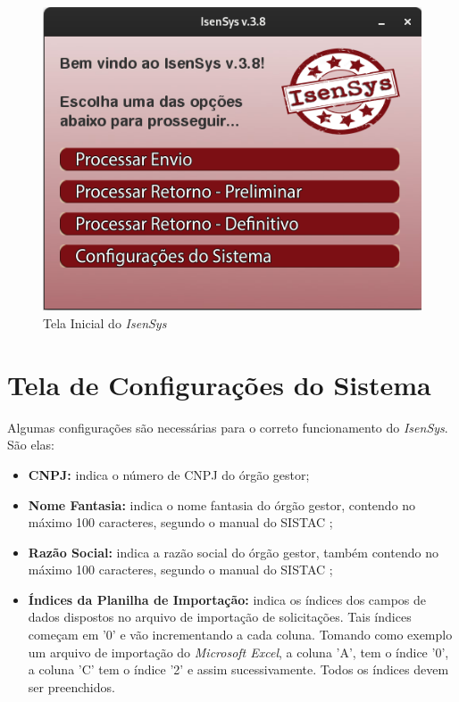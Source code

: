 \documentclass[
	12pt,			%
	openright,		%
	oneside,	
	a4paper,		%
	english,		%
	brazil			%
]{abntex2/abntex2}  %
\begin{document}
			\begin{figure}[ht]
				\begin{center}
					
					\caption{Tela Inicial do \textit{IsenSys}}
					\label{tela-inicial-img}
					
					\includegraphics[scale=0.5]{img/inicial}
					
				\end{center}
			\end{figure}

		\section{Tela de Configurações do Sistema}
		
			Algumas configurações são necessárias para o correto funcionamento do \textit{IsenSys}. São elas:
			
			\begin{itemize}
				
				\item \textbf{CNPJ:} indica o número de CNPJ do órgão gestor;
				\item \textbf{Nome Fantasia:} indica o nome fantasia do órgão gestor, contendo no máximo 100 caracteres, segundo o manual do SISTAC \cite{sistac-formatos};
				\item \textbf{Razão Social:} indica a razão social do órgão gestor, também contendo no máximo 100 caracteres, segundo o manual do SISTAC \cite{sistac-formatos};
				\item \textbf{Índices da Planilha de Importação:} indica os índices dos campos de dados dispostos no arquivo de importação de solicitações. Tais índices começam em '0' e vão incrementando a cada coluna. Tomando como exemplo um arquivo de importação do \textit{Microsoft Excel}, a coluna 'A', tem o índice '0', a coluna 'C' tem o índice '2' e assim sucessivamente. Todos os índices devem ser preenchidos.
				
			\end{itemize}
			
\end{document}
